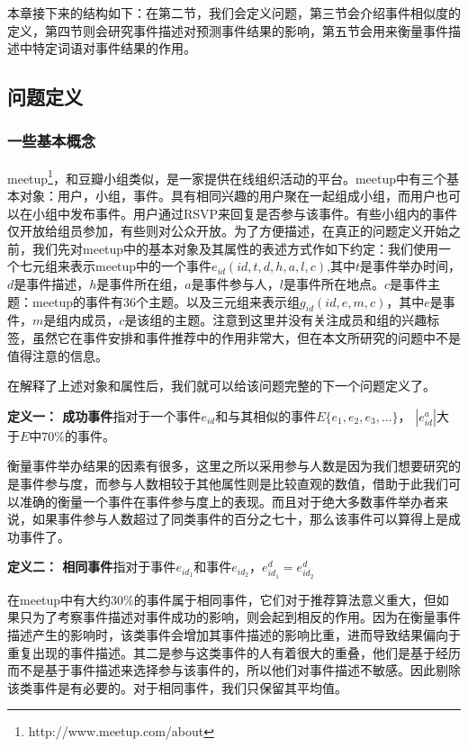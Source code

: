 \documentclass[12pt]{template}
\begin{document}
本章接下来的结构如下：在第二节，我们会定义问题，第三节会介绍事件相似度的定义，第四节则会研究事件描述对预测事件结果的影响，第五节会用来衡量事件描述中特定词语对事件结果的作用。

\subsection{问题定义}
\subsubsection{一些基本概念}
meetup\footnote{http://www.meetup.com/about}，和豆瓣小组类似，是一家提供在线组织活动的平台。meetup中有三个基本对象：用户，小组，事件。具有相同兴趣的用户聚在一起组成小组，而用户也可以在小组中发布事件。用户通过RSVP来回复是否参与该事件。有些小组内的事件仅开放给组员参加，有些则对公众开放。为了方便描述，在真正的问题定义开始之前，我们先对meetup中的基本对象及其属性的表述方式作如下约定：我们使用一个七元组来表示meetup中的一个事件\(e_{id}(id,t,d,h,a,l,c)\),其中\(t\)是事件举办时间，\(d\)是事件描述，\(h\)是事件所在组，\(a\)是事件参与人，\(l\)是事件所在地点。\(c\)是事件主题：meetup的事件有36个主题。以及三元组来表示组\(g_{id}(id,e,m,c)\)，其中\(e\)是事件，\(m\)是组内成员，\(c\)是该组的主题。注意到这里并没有关注成员和组的兴趣标签，虽然它在事件安排和事件推荐中的作用非常大，但在本文所研究的问题中不是值得注意的信息。

在解释了上述对象和属性后，我们就可以给该问题完整的下一个问题定义了。

\textbf{定义一： 成功事件}指对于一个事件\(e_{id}\)和与其相似的事件\(E\{e_1,e_2,e_3,...\}\)，
\(|e_{id}^a|\)大于\(E\)中\(70\)\%的事件。

衡量事件举办结果的因素有很多，这里之所以采用参与人数是因为我们想要研究的是事件参与度，而参与人数相较于其他属性则是比较直观的数值，借助于此我们可以准确的衡量一个事件在事件参与度上的表现。而且对于绝大多数事件举办者来说，如果事件参与人数超过了同类事件的百分之七十，那么该事件可以算得上是成功事件了。

\textbf{定义二： 相同事件}指对于事件\(e_{id_1}\)和事件\(e_{id_2}\)，\(e_{id_1}^d=e_{id_2}^d\)

在meetup中有大约30\%的事件属于相同事件，它们对于推荐算法意义重大，但如果只为了考察事件描述对事件成功的影响，则会起到相反的作用。因为在衡量事件描述产生的影响时，该类事件会增加其事件描述的影响比重，进而导致结果偏向于重复出现的事件描述。其二是参与这类事件的人有着很大的重叠，他们是基于经历而不是基于事件描述来选择参与该事件的，所以他们对事件描述不敏感。因此剔除该类事件是有必要的。对于相同事件，我们只保留其平均值。
\end{document}
